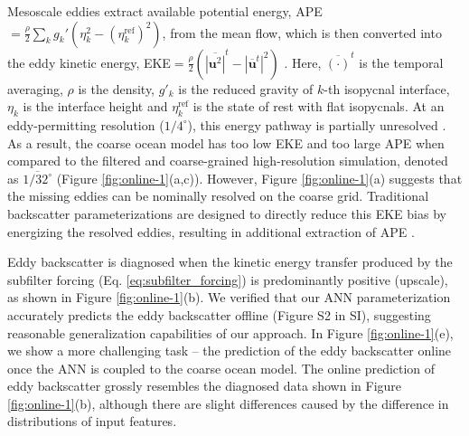 \documentclass[draft]{agujournal2019}
\begin{document}
%
Mesoscale eddies extract available potential energy, APE$=\frac{\rho}{2} \sum_k g_k' ( \eta_k^2 - (\eta^{\mathrm{ref}}_k)^2 )$, from the mean flow, which is then converted into the eddy kinetic energy, EKE$=\frac{\rho}{2}(\overline{|\mathbf{u}^2|}^t-|\overline{\mathbf{u}}^t|^2)$ \cite{salmon1980baroclinic}. Here, $\overline{(\cdot)}^t$ is the temporal averaging, $\rho$ is the density, $g'_k$ is the reduced gravity of $k$-th isopycnal interface, $\eta_k$ is the interface height and $\eta^{\mathrm{ref}}_k$ is the state of rest with flat isopycnals. At an eddy-permitting resolution ($1/4^\circ$), this energy pathway is partially unresolved \cite{jansen2014parameterizing, mana2014toward, juricke2019ocean, loose2023diagnosing}. As a result, the coarse ocean model has too low EKE and too large APE when compared to the filtered and coarse-grained high-resolution simulation, denoted as $\overline{1/32^\circ}$ (Figure \ref{fig:online-1}(a,c)). However, Figure \ref{fig:online-1}(a) suggests that the missing eddies can be nominally resolved on the coarse grid. Traditional backscatter parameterizations are designed to directly reduce this EKE bias by energizing the resolved eddies, resulting in additional extraction of APE \cite{jansen2014parameterizing, yankovsky2024}.

Eddy backscatter is diagnosed when the kinetic energy transfer produced by the subfilter forcing (Eq. \eqref{eq:subfilter_forcing}) is predominantly positive (upscale), as shown in Figure \ref{fig:online-1}(b).
We verified that our ANN parameterization accurately predicts the eddy backscatter offline (Figure S2 in SI), suggesting reasonable generalization capabilities of our approach. In Figure \ref{fig:online-1}(e), we show a more challenging task -- the prediction of the eddy backscatter online once the ANN is coupled to the coarse ocean model. The online prediction of eddy backscatter grossly resembles the diagnosed data shown in Figure \ref{fig:online-1}(b), although there are slight differences caused by the difference in distributions of input features.
\end{document}
